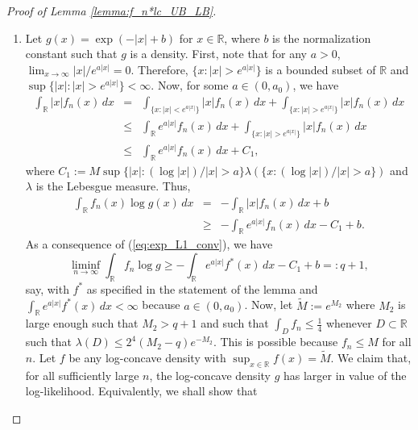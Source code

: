 \documentclass[12pt,letterpaper, twoside, openany]{article}
\theoremstyle{plain}
\begin{document}
\begin{proof}[Proof of Lemma \ref{lemma:f_n*lc_UB_LB}]

\begin{enumerate}%
	\item [(a)] Let $g(x) = \exp(-|x|+b)$ for $x \in \mathbb{R}$, where $b$ is the normalization constant such that $g$ is a density.
	First, note that for any $a > 0$, $\lim_{x\rightarrow \infty} |x|/e^{a|x|} = 0$. Therefore, $\{x: |x| > e^{a|x|}\}$ is a bounded subset of $\mathbb{R}$ and $\sup\{|x|:|x| > e^{a|x|} \} < \infty$. Now, for some $a \in (0, a_0)$, we have
	\begin{eqnarray}
		\int_\mathbb{R} |x| f_n(x)\, dx &=& \int_{ \{x:|x| < e^{a|x|} \} } |x| f_n(x)\, dx + \int_{ \{x:|x| > e^{a|x|} \} }|x| f_n(x)\, dx \nonumber \\
		&\leq& \int_{\mathbb{R}} e^{a|x|}f_n(x)\, dx + \int_{{ \{x:|x| > e^{a|x|} \} }}|x| f_n(x)\, dx \nonumber \\
		&\leq & \int_{\mathbb{R}} e^{a|x|}f_n(x)\, dx + C_1, \label{eq:bound_xf_n}
	\end{eqnarray}
	where $C_1 := M\sup\{|x|: (\log |x|)/|x|> a\} \lambda({ \{x: (\log |x|)/|x|> a \} })$ and $\lambda$ is the Lebesgue measure. Thus,
	\begin{eqnarray*}
		\int_\mathbb{R} f_n(x) \log g(x) \, dx &=& - \int_\mathbb{R} |x| f_n(x) \, dx + b\\
		& \geq& - \int_\mathbb{R} e^{a|x|}f_n(x)\, dx - C_1 + b.
	\end{eqnarray*}
	As a consequence of (\ref{eq:exp_L1_conv}), we have
	\begin{equation}\label{eq:lower_bound_fnlogg}
		\liminf_{n \rightarrow \infty} \int_\mathbb{R} f_n \log g \geq - \int_\mathbb{R} e^{a|x|} f^*(x) \, dx - C_1 + b =: q + 1,
	\end{equation}
	say, with $f^*$ as specified in the statement of the lemma and $\int_{\mathbb{R}} e^{a|x|}f^*(x)\, dx < \infty$ because $a \in (0, a_0)$. Now, let $\widetilde{M} := e^{M_2}$ where $M_2$ is large enough such that $M_2 > q+1$ and such that $\int_D f_n \leq \frac{1}{4}$ whenever $D \subset \mathbb{R}$ such that $\lambda(D) \leq 2^4 (M_2 - q) e^{-M_2}$. This is possible because $f_n \leq M$ for all $n$. Let $f$ be any log-concave density with $\sup_{x \in \mathbb{R}} f(x) =\widetilde{M}$. We claim that, for all sufficiently large $n$, the log-concave density $g$ has larger in value of the log-likelihood. Equivalently, we shall show that
	\begin{equation}\label{eq:f_cannot_be_NPMLE}

\end{equation}
\end{enumerate}
\end{proof}
\end{document}
